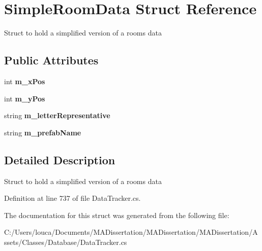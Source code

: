 \hypertarget{struct_simple_room_data}{}\section{Simple\+Room\+Data Struct Reference}
\label{struct_simple_room_data}


Struct to hold a simplified version of a rooms data  


\subsection*{Public Attributes}
\begin{DoxyCompactItemize}
\item 
\mbox{\label{struct_simple_room_data_ac80e688a9bad8937da529273c913ecff}} 
int {\bfseries m\+\_\+x\+Pos}
\item 
\mbox{\label{struct_simple_room_data_a37ba4564682f18286647606797e0956f}} 
int {\bfseries m\+\_\+y\+Pos}
\item 
\mbox{\label{struct_simple_room_data_ac024ae430b6bd0f2e2ffca2fa9fbfb43}} 
string {\bfseries m\+\_\+letter\+Representative}
\item 
\mbox{\label{struct_simple_room_data_a838ada358f16225cdf39a2cddc753a15}} 
string {\bfseries m\+\_\+prefab\+Name}
\end{DoxyCompactItemize}


\subsection{Detailed Description}
Struct to hold a simplified version of a rooms data 



Definition at line 737 of file Data\+Tracker.\+cs.



The documentation for this struct was generated from the following file\+:\begin{DoxyCompactItemize}
\item 
C\+:/\+Users/louca/\+Documents/\+M\+A\+Dissertation/\+M\+A\+Dissertation/\+M\+A\+Dissertation/\+Assets/\+Classes/\+Database/Data\+Tracker.\+cs\end{DoxyCompactItemize}
